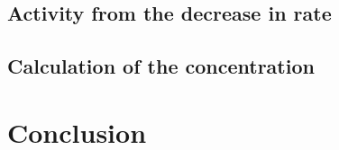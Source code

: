 \subsection{Activity from the decrease in rate}
\label{sec:SAfromDecrease}



\subsection{Calculation of the concentration}
\label{sec:calcOfTheCon}


\section{Conclusion}






































